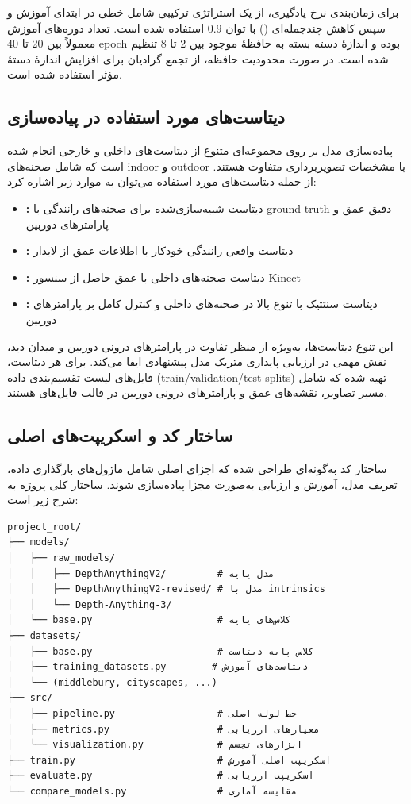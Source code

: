 برای زمان‌بندی نرخ یادگیری، از یک استراتژی ترکیبی شامل  خطی در ابتدای آموزش و سپس کاهش چندجمله‌ای () با توان $0.9$ استفاده شده است. تعداد دوره‌های آموزش معمولاً بین 20 تا 40 epoch بوده و اندازهٔ دسته بسته به حافظهٔ موجود بین 2 تا 8 تنظیم شده است. در صورت محدودیت حافظه، از تجمع گرادیان برای افزایش اندازهٔ دستهٔ مؤثر استفاده شده است.

\subsection{دیتاست‌های مورد استفاده در پیاده‌سازی}

پیاده‌سازی مدل بر روی مجموعه‌ای متنوع از دیتاست‌های داخلی و خارجی انجام شده است که شامل صحنه‌های indoor و outdoor با مشخصات تصویربرداری متفاوت هستند. از جمله دیتاست‌های مورد استفاده می‌توان به موارد زیر اشاره کرد:

\begin{itemize}
    \item \textbf{:} دیتاست شبیه‌سازی‌شده برای صحنه‌های رانندگی با ground truth دقیق عمق و پارامترهای دوربین
    \item \textbf{:} دیتاست واقعی رانندگی خودکار با اطلاعات عمق از لایدار
    \item \textbf{:} دیتاست صحنه‌های داخلی با عمق حاصل از سنسور Kinect
    \item \textbf{:} دیتاست سنتتیک با تنوع بالا در صحنه‌های داخلی و کنترل کامل بر پارامترهای دوربین
\end{itemize}

این تنوع دیتاست‌ها، به‌ویژه از منظر تفاوت در پارامترهای درونی دوربین و میدان دید، نقش مهمی در ارزیابی پایداری متریک مدل پیشنهادی ایفا می‌کند. برای هر دیتاست، فایل‌های لیست تقسیم‌بندی داده (train/validation/test splits) تهیه شده که شامل مسیر تصاویر، نقشه‌های عمق و پارامترهای درونی دوربین در قالب فایل‌های  هستند.

\subsection{ساختار کد و اسکریپت‌های اصلی}

ساختار کد به‌گونه‌ای طراحی شده که اجزای اصلی شامل ماژول‌های بارگذاری داده، تعریف مدل، آموزش و ارزیابی به‌صورت مجزا پیاده‌سازی شوند. ساختار کلی پروژه به شرح زیر است:

\begin{verbatim}
project_root/
├── models/
│   ├── raw_models/
│   │   ├── DepthAnythingV2/         # مدل پایه
│   │   ├── DepthAnythingV2-revised/ # مدل با intrinsics
│   │   └── Depth-Anything-3/
│   └── base.py                      # کلاس‌های پایه
├── datasets/
│   ├── base.py                      # کلاس پایه دیتاست
│   ├── training_datasets.py        # دیتاست‌های آموزش
│   └── (middlebury, cityscapes, ...)
├── src/
│   ├── pipeline.py                  # خط لوله اصلی
│   ├── metrics.py                   # معیارهای ارزیابی
│   └── visualization.py             # ابزارهای تجسم
├── train.py                         # اسکریپت اصلی آموزش
├── evaluate.py                      # اسکریپت ارزیابی
└── compare_models.py                # مقایسه آماری
\end{verbatim}

